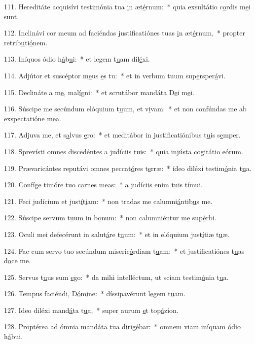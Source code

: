 111. Hereditáte acquisívi testimónia tua \uline{i}n æt\uline{é}rnum:~* quia exsultátio c\uline{o}rdis m\uline{e}i sunt.\par 
112. Inclinávi cor meum ad faciéndas justificatiónes tuas \uline{i}n æt\uline{é}rnum,~* propter retrib\uline{u}ti\uline{ó}nem.\par 
113. Iníquos ódio h\uline{á}b\uline{u}i:~* et legem t\uline{u}am dil\uline{é}xi.\par 
114. Adjútor et suscéptor m\uline{e}us \uline{e}s tu:~* et in verbum tuum sup\uline{e}rsper\uline{á}vi.\par 
115. Declináte a m\uline{e}, mal\uline{í}gni:~* et scrutábor mandáta D\uline{e}i m\uline{e}i.\par 
116. Súscipe me secúndum elóquium t\uline{u}um, et v\uline{i}vam:~* et non confúndas me ab exspectati\uline{ó}ne m\uline{e}a.\par 
117. Adjuva me, et s\uline{a}lvus \uline{e}ro:~* et meditábor in justificatiónibus t\uline{u}is s\uline{e}mper.\par 
118. Sprevísti omnes discedéntes a jud\uline{í}ciis t\uline{u}is:~* quia injústa cogitáti\uline{o} e\uline{ó}rum.\par 
119. Prævaricántes reputávi omnes peccat\uline{ó}res t\uline{e}rræ:~* ídeo diléxi testim\uline{ó}nia t\uline{u}a.\par 
120. Confíge timóre tuo c\uline{a}rnes m\uline{e}as:~* a judíciis enim t\uline{u}is t\uline{í}mui.\par 
121. Feci judícium et just\uline{í}t\uline{i}am:~* non tradas me calumni\uline{á}ntib\uline{u}s me.\par 
122. Súscipe servum t\uline{u}um in b\uline{o}num:~* non calumniéntur m\uline{e} sup\uline{é}rbi.\par 
123. Oculi mei defecérunt in salut\uline{á}re t\uline{u}um:~* et in elóquium just\uline{í}tiæ t\uline{u}æ.\par 
124. Fac cum servo tuo secúndum miseric\uline{ó}rdiam t\uline{u}am:~* et justificatiónes t\uline{u}as d\uline{o}ce me.\par 
125. Servus t\uline{u}us sum \uline{e}go:~* da mihi intelléctum, ut sciam testim\uline{ó}nia t\uline{u}a.\par 
126. Tempus faciéndi, D\uline{ó}m\uline{i}ne:~* díssipavérunt l\uline{e}gem t\uline{u}am.\par 
127. Ideo diléxi mand\uline{á}ta t\uline{u}a,~* super aurum \uline{e}t top\uline{á}zion.\par 
128. Proptérea ad ómnia mandáta tua d\uline{i}rig\uline{é}bar:~* omnem viam iníquam \uline{ó}dio h\uline{á}bui.\par 
